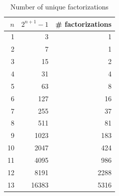     \begin{table}[h!]
            \centering
            \caption{Number of unique factorizations}
            \label{tab:data}    
        \begin{tabular}{|r|r|r|}
            \hline
            $n$ & $2^{n+1}-1$ & \# factorizations \\ \hline
            1 & 3 & 1 \\ \hline 
            2 & 7 & 1 \\ \hline 
            3 & 15 & 2 \\ \hline 
            4 & 31 & 4 \\ \hline 
            5 & 63 & 8 \\ \hline 
            6 & 127 & 16 \\ \hline 
            7 & 255 & 37 \\ \hline 
            8 & 511 & 81 \\ \hline 
            9 & 1023 & 183 \\ \hline 
            10 & 2047 & 424 \\ \hline 
            11 & 4095 & 986 \\ \hline 
            12 & 8191 & 2288 \\ \hline 
            13 & 16383 & 5316 \\ \hline 
        \end{tabular}

    \end{table}
    
